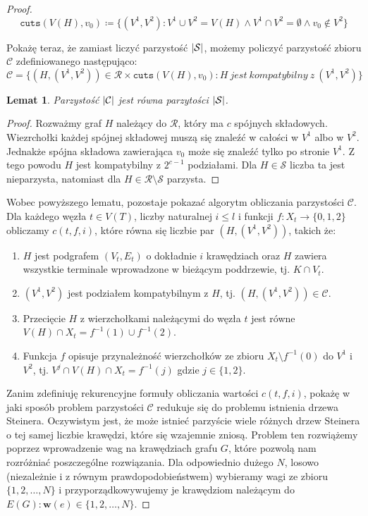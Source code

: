 \documentclass[12pt, oneside]{report}
\newtheorem{lemma}{Lemat}
\begin{document}
\begin{proof}
$$\texttt{cuts} (V(H), v_0) \coloneqq \{(V^1, V^2): V^1 \cup V^2 = V(H) \wedge V^1 \cap V^2 = \emptyset \wedge v_0 \notin V^2\}$$

Pokażę teraz, że zamiast liczyć parzystość $\abs{\mathcal{S}}$, możemy policzyć parzystość zbioru $\mathcal{C}$ zdefiniowanego następująco:
$$\mathcal{C} = \{(H, (V^1, V^2)) \in \mathcal{R} \times \texttt{cuts}(V(H), v_0) : H\ jest\ kompatybilny\ z\ (V^1, V^2)\}$$

\begin{lemma}
Parzystość $\abs{\mathcal{C}}$ jest równa parzytości $\abs{\mathcal{S}}$.
\end{lemma}

\begin{proof}
Rozważmy graf $H$ należący do $\mathcal{R}$, który ma $c$ spójnych składowych. Wiezrchołki każdej spójnej składowej muszą się znaleźć w całości w $V^1$ albo w $V^2$. Jednakże spójna składowa zawierająca $v_0$ może się znaleźć tylko po stronie $V^1$. Z tego powodu $H$ jest kompatybilny z $2^{c-1}$ podziałami. Dla $H \in \mathcal{S}$ liczba ta jest nieparzysta, natomiast dla $H \in \mathcal{R} \setminus \mathcal{S}$ parzysta. 
\end{proof}

Wobec powyższego lematu, pozostaje pokazać algorytm obliczania parzystości $\mathcal{C}$. Dla każdego węzła $t \in V(T)$, liczby naturalnej $i \leq l$ i funkcji $f: X_t \to \{0,1,2\}$ obliczamy $c(t, f, i)$, które równa się liczbie par $(H, (V^1, V^2))$, takich że:

\begin{enumerate}[label=(\roman*)]
\item $H$ jest podgrafem $(V_t, E_t)$ o dokładnie $i$ krawędziach oraz $H$ zawiera wszystkie terminale wprowadzone w bieżącym poddrzewie, tj. $K \cap V_t$.
\item $(V^1, V^2)$ jest podziałem kompatybilnym z $H$, tj. $(H, (V^1, V^2)) \in \mathcal{C}$.
\item Przecięcie $H$ z wierzchołkami należącymi do węzła $t$ jest równe $V(H) \cap X_t = f^{-1}(1) \cup f^{-1}(2)$.
\item Funkcja $f$ opisuje przynależność wierzchołków ze zbioru $X_t \setminus f^{-1}(0)$ do $V^1$ i $V^2$, tj. $V^j \cap V(H) \cap X_t = f^{-1}(j)$ gdzie $j \in \{1,2\}$.
\end{enumerate} 

Zanim zdefiniuję rekurencyjne formuły obliczania wartości $c(t, f, i)$, pokażę w jaki sposób problem parzystości $\mathcal{C}$ redukuje się do problemu istnienia drzewa Steinera. Oczywistym jest, że może istnieć parzyście wiele różnych drzew Steinera o tej samej liczbie krawędzi, które się wzajemnie zniosą. Problem ten rozwiążemy poprzez wprowadzenie wag na krawędziach grafu $G$, które pozwolą nam rozróżniać poszczególne rozwiązania. 
Dla odpowiednio dużego $N$, losowo (niezależnie i z równym prawdopodobieństwem) wybieramy wagi ze zbioru $\{1,2,\dots,N\}$ i przyporządkowywujemy je krawędziom należącym do $E(G): \mathbf{w}(e) \in \{1,2,\dots,N\}$. 


\end{proof}
\end{document}
